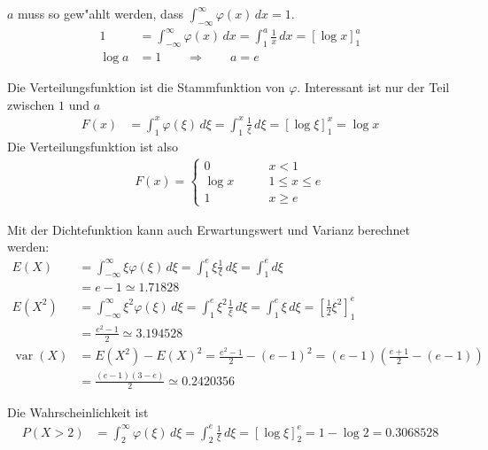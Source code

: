 \begin{loesung}
\begin{teilaufgaben}
\item
$a$ muss so gew"ahlt werden, dass
$\int_{-\infty}^\infty  \varphi(x)\,dx=1$.
\begin{align*}
1&=
\int_{-\infty}^{\infty}\varphi(x)\,dx
=
\int_1^a \frac1x\,dx
=
\left[
\log x
\right]_1^a
\\
\log a&=1\qquad \Rightarrow \qquad a=e
\end{align*}
\item
Die Verteilungsfunktion ist die Stammfunktion von $\varphi$. Interessant ist
nur der Teil zwischen $1$ und $a$
\begin{align*}
F(x)&=\int_1^x \varphi(\xi)\,d\xi=\int_1^x\frac1{\xi}\,d\xi=\left[\log\xi\right]_1^x=\log x
\end{align*}
Die Verteilungsfunktion ist also
\begin{align*}
F(x)=\begin{cases}
0&\qquad x < 1\\
\log x&\qquad 1\le x\le e\\
1&\qquad x \ge e
\end{cases}
\end{align*}
\item
Mit der Dichtefunktion kann auch Erwartungswert und Varianz berechnet werden:
\begin{align*}
E(X)
&=
\int_{-\infty}^\infty \xi\varphi(\xi)\,d\xi
=
\int_1^e\xi\frac1\xi\,d\xi
=
\int_1^ed\xi\\
&=e-1\simeq 1.71828
\\
E(X^2)
&=
\int_{-\infty}^\infty \xi^2\varphi(\xi)\,d\xi
=
\int_1^e\xi^2\frac1\xi\,d\xi
=
\int_1^e\xi\,d\xi=\left[\frac12\xi^2\right]_1^e\\
&=\frac{e^2 -1}2
\simeq 3.194528
\\
\operatorname{var}(X)
&=
E(X^2)-E(X)^2=\frac{e^2-1}2-(e-1)^2
=
(e-1)\left(
\frac{e+1}2-(e-1)
\right)
\\
&=
\frac{(e-1)(3-e)}2
\simeq
0.2420356
\end{align*}
\item
Die Wahrscheinlichkeit ist
\begin{align*}
P(X>2)
&=
\int_2^\infty\varphi(\xi)\,d\xi =\int_2^e\frac1\xi\,d\xi=\left[\log\xi\right]_2^e
=1-\log 2=0.3068528
\end{align*}
\end{teilaufgaben}
\end{loesung}

